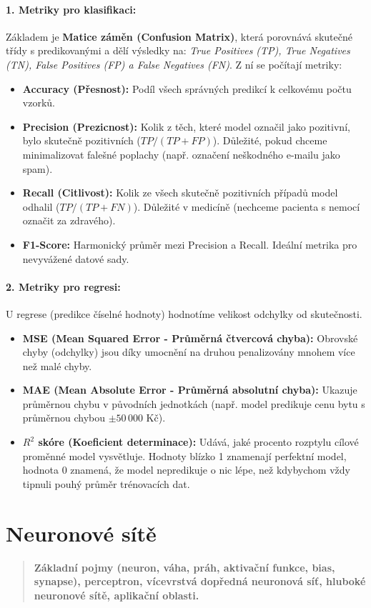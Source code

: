 \paragraph*{1. Metriky pro klasifikaci:}
Základem je \textbf{Matice záměn (Confusion Matrix)}, která porovnává skutečné třídy s predikovanými a dělí výsledky na: \textit{True Positives (TP), True Negatives (TN), False Positives (FP) a False Negatives (FN)}. Z ní se počítají metriky:
\begin{itemize}
    \item \textbf{Accuracy (Přesnost):} Podíl všech správných predikcí k celkovému počtu vzorků.
    \item \textbf{Precision (Prezicnost):} Kolik z těch, které model označil jako pozitivní, bylo skutečně pozitivních ($TP / (TP + FP)$). Důležité, pokud chceme minimalizovat falešné poplachy (např. označení neškodného e-mailu jako spam).
    \item \textbf{Recall (Citlivost):} Kolik ze všech skutečně pozitivních případů model odhalil ($TP / (TP + FN)$). Důležité v medicíně (nechceme pacienta s nemocí označit za zdravého).
    \item \textbf{F1-Score:} Harmonický průměr mezi Precision a Recall. Ideální metrika pro nevyvážené datové sady.
\end{itemize}

\paragraph*{2. Metriky pro regresi:}
U regrese (predikce číselné hodnoty) hodnotíme velikost odchylky od skutečnosti.
\begin{itemize}
    \item \textbf{MSE (Mean Squared Error - Průměrná čtvercová chyba):} Obrovské chyby (odchylky) jsou díky umocnění na druhou penalizovány mnohem více než malé chyby.
    \item \textbf{MAE (Mean Absolute Error - Průměrná absolutní chyba):} Ukazuje průměrnou chybu v původních jednotkách (např. model predikuje cenu bytu s průměrnou chybou $\pm 50\,000$ Kč).
    \item \textbf{$R^2$ skóre (Koeficient determinace):} Udává, jaké procento rozptylu cílové proměnné model vysvětluje. Hodnoty blízko 1 znamenají perfektní model, hodnota 0 znamená, že model nepredikuje o nic lépe, než kdybychom vždy tipnuli pouhý průměr trénovacích dat.
\end{itemize}

\section{Neuronové sítě}
\begin{quote}
    \textbf{Základní pojmy (neuron, váha, práh, aktivační funkce, bias, synapse), perceptron, vícevrstvá dopředná neuronová síť, hluboké neuronové sítě, aplikační oblasti.}
\end{quote}

